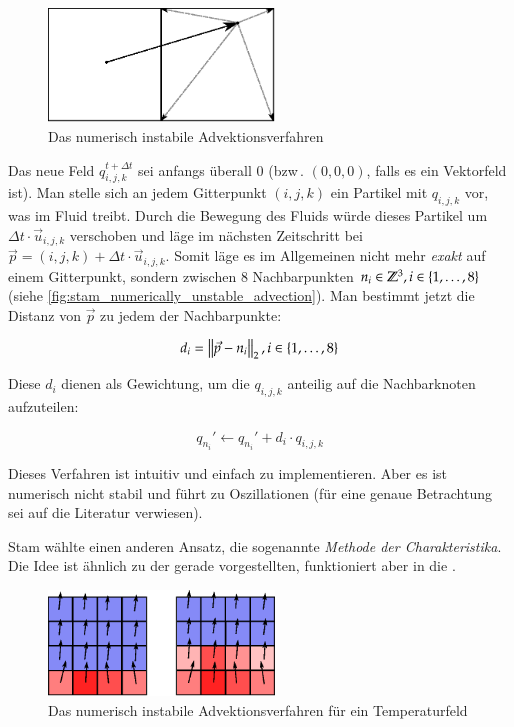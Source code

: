\begin{figure}[ht]
\centering
\includegraphics[width=6cm]{images/advection_bad}
\caption{Das numerisch instabile Advektionsverfahren}
\label{fig:stam_numerically_unstable_advection}
\end{figure}

Das neue Feld $q_{i,j,k}^{t+\Delta t}$ sei anfangs überall 0 (bzw\,. $(0,0,0)$,
falls es ein Vektorfeld ist). Man stelle sich an jedem Gitterpunkt
$(i,j,k)$ ein Partikel mit  $q_{i,j,k}$ vor, was im Fluid
treibt. Durch die Bewegung des Fluids würde dieses Partikel um $\Delta t \cdot
\vec{u}_{i,j,k}$ verschoben und läge im nächsten Zeitschritt bei
$\vec{p}=(i,j,k)+\Delta t \cdot \vec{u}_{i,j,k}$. Somit läge es im Allgemeinen
nicht mehr \emph{exakt} auf einem Gitterpunkt, sondern zwischen 8 Nachbarpunkten
$n_i \in \PimiddyGanz^3, i \in \{1,\ldots,8\}$ (siehe
\autoref{fig:stam_numerically_unstable_advection}). Man bestimmt jetzt die
Distanz von $\vec{p}$ zu jedem der Nachbarpunkte:

\begin{equation}
d_i = \PimiddyNorm{2}{\vec{p} - n_i}, i \in \{1,\ldots,8\}
\end{equation}

Diese $d_i$ dienen als Gewichtung, um die  $q_{i,j,k}$
anteilig auf die Nachbarknoten aufzuteilen:

\begin{equation}
q_{n_i}' \leftarrow q_{n_i}' + d_i \cdot q_{i,j,k}
\end{equation}

Dieses Verfahren ist intuitiv und einfach zu implementieren. Aber es ist
numerisch nicht stabil und führt zu Oszillationen (für eine genaue Betrachtung
sei auf die Literatur verwiesen).

Stam wählte einen anderen Ansatz, die sogenannte \emph{Methode der
Charakteristika}. Die Idee ist ähnlich zu der gerade vorgestellten, funktioniert
aber in die .

\begin{figure}[ht]
\includegraphics[width=6cm]{images/advection_bad_example}
\caption{Das numerisch instabile Advektionsverfahren für ein Temperaturfeld}
\end{figure}

